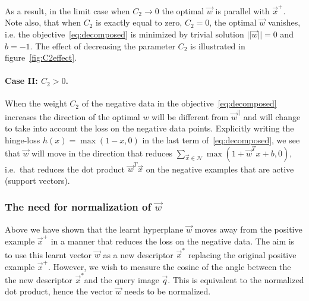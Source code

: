          As a result, in the limit case when $C_2 \rightarrow 0$ the optimal $\vec{w}$ is parallel with $\vec{x}^+$. Note also, that when $C_2$ is exactly equal to zero, $C_2 = 0$, the optimal $\vec{w}$ vanishes, i.e. the objective~\eqref{eq:decomposed} is minimized by trivial solution $||\vec{w}|| = 0$ and $b = -1$. The effect of decreasing the parameter $C_2$ is illustrated in figure~\ref{fig:C2effect}.


      \paragraph{Case II: $C_2>0$.}
         When the weight $C_2$ of the negative data in the objective~\eqref{eq:decomposed} increases the direction of the optimal $w$ will be different from $\vec{w}^{||}$ and will change to take into account the loss on the negative data points. Explicitly writing the hinge-loss $h(x) = \max(1-x,0)$ in the last term of~\eqref{eq:decomposed}, we see that $\vec{w}$ will move in the direction that reduces $\sum_{\vec{x} \in \mathcal N}\max \left(1+\vec{w}^T x + b ,0 \right)$, i.e.\ that reduces the dot product $\vec{w}^T \vec{x}$ on the negative examples that are active (support vectors).
         
         
         
      \subsubsection*{The need for normalization of $\vec{w}$} 
      \label{sec:renormalization}
         Above we have shown that the learnt hyperplane $\vec{w}$ moves away from the positive example $\vec{x}^+$ in a manner that reduces the loss  on the negative data. The aim is to use this learnt vector $\vec{w}$ as a new descriptor $\vec{x}^*$  replacing the original positive example $\vec{x}^+$. However, we wish to measure the cosine of the angle between the the new descriptor $\vec{x}^*$and the query image $\vec{q}$. This is equivalent to the normalized dot product, hence the vector $\vec{w}$ needs to be normalized.




